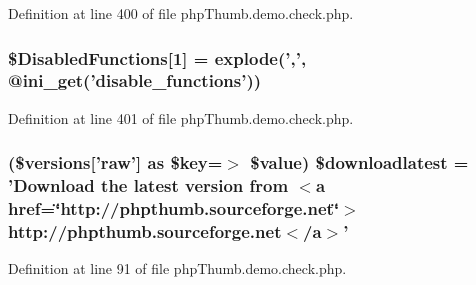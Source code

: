 \-Definition at line 400 of file php\-Thumb.\-demo.\-check.\-php.

\hypertarget{php_thumb_8demo_8check_8php_a5343e3103a76a26375f2a0dd78e53404}{
\subsubsection[{\$\-Disabled\-Functions}]{\setlength{\rightskip}{0pt plus 5cm}\$\-Disabled\-Functions\mbox{[}1\mbox{]} = explode(',', @ini\-\_\-get('disable\-\_\-functions'))}}\label{php_thumb_8demo_8check_8php_a5343e3103a76a26375f2a0dd78e53404}


\-Definition at line 401 of file php\-Thumb.\-demo.\-check.\-php.

\hypertarget{php_thumb_8demo_8check_8php_a2007a2042e35b0571aa4108c9068e8a9}{
\subsubsection[{\$downloadlatest}]{ (\$versions\mbox{[}'raw'\mbox{]} as \$key=$>$ \$value) \$downloadlatest = '\-Download the latest version from $<${\bf a} href=\char`\"{}http\-://phpthumb.\-sourceforge.\-net\char`\"{}$>$http\-://phpthumb.\-sourceforge.\-net$<$/{\bf a}$>$'}}\label{php_thumb_8demo_8check_8php_a2007a2042e35b0571aa4108c9068e8a9}


\-Definition at line 91 of file php\-Thumb.\-demo.\-check.\-php.

